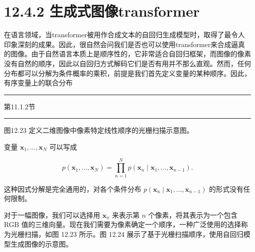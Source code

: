 \documentclass[10pt]{report}
\newcommand{\HRule}{\begin{center}\rule{0.9\linewidth}{0.2mm}\end{center}}
\begin{document}
\section*{12.4.2 生成式图像transformer}

在语言领域，当transformer被用作合成文本的自回归生成模型时，取得了最令人印象深刻的成果。因此，很自然会问我们是否也可以使用transformer来合成逼真的图像。由于自然语言本质上是顺序性的，它非常适合自回归框架，而图像的像素没有自然的顺序，因此以自回归方式解码它们是否有用并不那么直观。然而，任何分布都可以分解为条件概率的乘积，前提是我们首先定义变量的某种顺序。因此，有序变量上的联合分布

\HRule

第11.1.2节

\HRule

图12.23 定义二维图像中像素特定线性顺序的光栅扫描示意图。

\begin{center}
\end{center}

变量 \({\mathbf{x}}_{1},\ldots ,{\mathbf{x}}_{N}\) 可以写成

\[
p\left( {{\mathbf{x}}_{1},\ldots ,{\mathbf{x}}_{N}}\right)  = \mathop{\prod }\limits_{{n = 1}}^{N}p\left( {{\mathbf{x}}_{n} \mid  {\mathbf{x}}_{1},\ldots ,{\mathbf{x}}_{n - 1}}\right) . \tag{12.37}
\]

这种因式分解是完全通用的，对各个条件分布 \(p\left( {{\mathbf{x}}_{n} \mid  {\mathbf{x}}_{1},\ldots ,{\mathbf{x}}_{n - 1}}\right)\) 的形式没有任何限制。

对于一幅图像，我们可以选择用 \({\mathbf{x}}_{n}\) 来表示第 \(n\) 个像素，将其表示为一个包含 RGB 值的三维向量。现在我们需要为像素确定一个顺序，一种广泛使用的选择称为光栅扫描，如图 12.23 所示。图 12.24 展示了基于光栅扫描顺序，使用自回归模型生成图像的示意图。
\end{document}
